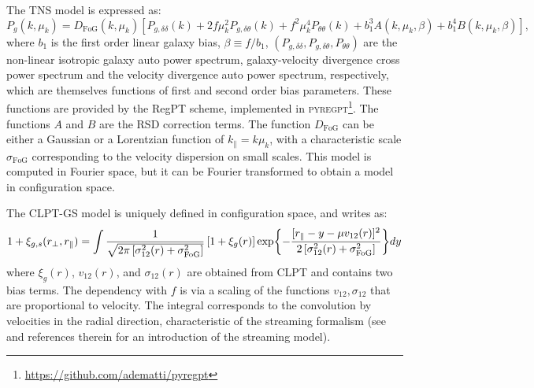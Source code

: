 The TNS model is expressed as:
\begin{equation}
    P_g(k, \mu_k) = D_\text{FoG}(k, \mu_k) 
    \left[ 
        P_{g, \delta \delta}(k) + 2 f \mu_k^2 P_{g, \delta \theta}(k) + f^2 \mu_k^4 P_{\theta \theta}(k)
        + b_1^3 A(k, \mu_k, \beta) + b_1^4 B(k, \mu_k, \beta)
    \right],
    \label{eq:tns_model}
\end{equation}
where $b_1$ is the first order linear galaxy bias, $\beta \equiv f/b_1$, 
$(P_{g, \delta \delta}, P_{g, \delta \theta},P_{\theta \theta})$ are the non-linear isotropic galaxy 
auto power spectrum, galaxy-velocity divergence cross power spectrum and the velocity divergence auto power spectrum, respectively, 
which are themselves functions of first and second order bias parameters. These functions are provided by 
the RegPT scheme, implemented in \textsc{pyregpt}\footnote{\url{https://github.com/adematti/pyregpt}}.
The functions $A$ and $B$ are the RSD correction terms. 
The function $D_\text{FoG}$ can be either a Gaussian or a Lorentzian function of $k_\parallel = k\mu_k$,
with a characteristic scale $\sigma_\text{FoG}$ corresponding to the velocity dispersion on small scales. 
This model is computed in Fourier space, but it can be Fourier transformed to obtain a model in configuration space. 

The CLPT-GS model is uniquely defined in configuration space, and writes as: 
\begin{equation}
 1 + \xi_{g,s}({r_\perp}, {r_\parallel}) = 
  \int  \frac{1}{\sqrt{2\pi \left[\sigma_{12}^2(r)+\sigma^2_\text{FoG}\right]}}
  \left[1+\xi_g(r)\right] 
  \exp{ - \frac{[r_\parallel-y-\mu v_{12}(r)]^2}
               {2\left[\sigma_{12}^2(r)+\sigma^2_\text{FoG}\right]}} dy
 \label{eq:clptgs_model}
\end{equation}
where $\xi_g(r)$, $v_{12}(r)$, and $\sigma_{12}(r)$ are obtained 
from CLPT and contains two bias terms. The dependency with $f$ is via a scaling of 
the functions $v_{12}, \sigma_{12}$ that are proportional to velocity. 
The integral corresponds to the convolution by velocities in the radial direction, 
characteristic of the streaming formalism 
(see \cite{kuruvillaStreamingModelRedshiftspace2018}
and references therein for an introduction of the streaming model).

